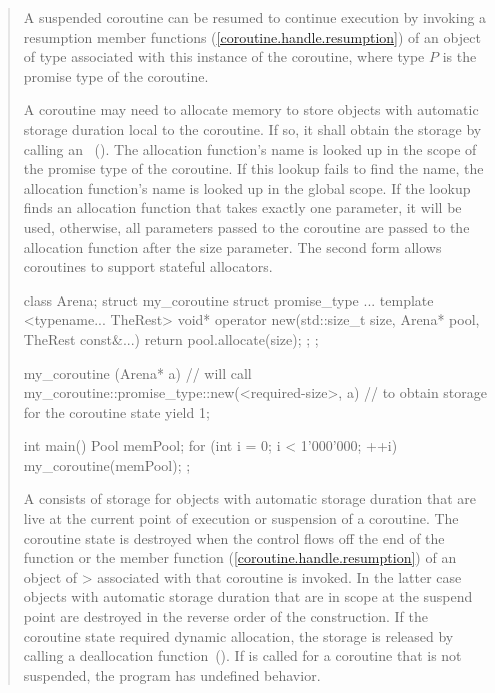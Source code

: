 \begin{quote}
\pnum
A suspended coroutine can be resumed
to continue execution by invoking
a resumption member functions (\ref{coroutine.handle.resumption}) of an object of  type
associated with this instance of the coroutine, where type $P$
is the promise type of the coroutine. 

\pnum
A coroutine may need to allocate
memory to store objects with automatic storage duration
local to the coroutine. If so, it shall obtain the storage by calling an
~().
The allocation function's name is looked up in the scope of the promise type of the coroutine. If this lookup fails to find the name, the allocation function's name is looked up in the global scope. If the lookup finds an allocation function that takes exactly one parameter, it will be used, otherwise, all parameters passed to the coroutine are passed to the allocation function after the size parameter.
\enternote The second form allows coroutines to support stateful allocators.
\exitnote

\pnum
\enterexample
\begin{codeblock}
  class Arena;
  struct my_coroutine {
    struct promise_type {
      ...
      template <typename... TheRest>
      void* operator new(std::size_t size, Arena* pool, TheRest const&...) {
        return pool.allocate(size);
      }
    };
  };

  my_coroutine (Arena* a) {
    // will call my_coroutine::promise_type::new(<required-size>, a)
    // to obtain storage for the coroutine state
    yield 1;
  }
  
  int main() {
    Pool memPool;
    for (int i = 0; i < 1'000'000; ++i)
      my_coroutine(memPool);
  };
\end{codeblock}
\exitexample


\pnum
A  consists of 
storage for objects with automatic storage duration
that are live at the current point of execution or suspension of 
a coroutine.
The coroutine state is destroyed when
the control flows off the end of the function or
the  member function (\ref{coroutine.handle.resumption}) of an object of > associated with that coroutine is invoked. In the latter case objects with automatic storage duration that are in scope
at the suspend point are destroyed in the reverse order of the construction. If the coroutine state required dynamic allocation, the storage is released by calling a deallocation
function~(). If  is called for a coroutine that is not suspended, the program has undefined behavior.


\end{quote}

